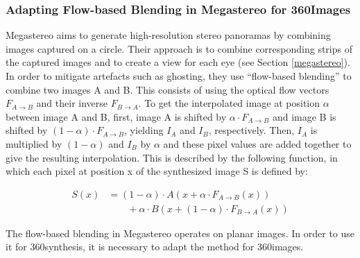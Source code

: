 
\subsubsection{Adapting Flow-based Blending in Megastereo for 360\degree Images}
Megastereo \cite{megastereo} aims to generate high-resolution stereo panoramas by combining images captured on a circle. Their approach is to combine corresponding strips of the captured images and to create a view for each eye (see Section \ref{megastereo}). In order to mitigate artefacts such as ghosting, they use ``flow-based blending'' to combine two images A and B. This consists of using the optical flow vectors $F_{A\rightarrow B}$ and their inverse $F_{B\rightarrow A}$. To get the interpolated image at position $\alpha$ between image A and B, first, image A is shifted by $\alpha \cdot F_{A\to B}$ and image B is shifted by $(1 - \alpha) \cdot F_{A\to B}$, yielding $I_A$ and $I_B$, respectively. Then, $I_A$ is multiplied by $(1-\alpha)$ and $I_B$ by $\alpha$ and these pixel values are added together to give the resulting interpolation. This is described by the following function, in which each pixel at position x of the synthesized image S is defined by: 

\begin{align}
S(x) &= (1-\alpha ) \cdot A( x + \alpha \cdot F_{A\to B}(x)) \nonumber\\
     &\qquad {} + \alpha \cdot B( x + (1-\alpha) \cdot F_{B\to A}(x))
\end{align}

The flow-based blending in Megastereo operates on planar images. In order to use it for 360\degree synthesis, it is necessary to adapt the method for 360\degree images.


